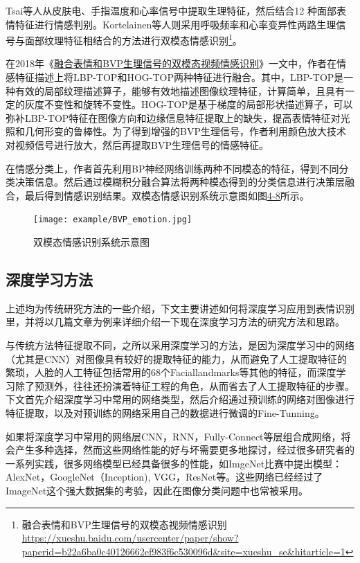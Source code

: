 Tsai等人从皮肤电、手指温度和心率信号中提取生理特征，然后结合12 种面部表情特征进行情感判别。Kortelainen等人则采用呼吸频率和心率变异性两路生理信号与面部纹理特征相结合的方法进行双模态情感识别\footnote{融合表情和BVP生理信号的双模态视频情感识别 \quad \url{https://xueshu.baidu.com/usercenter/paper/show?paperid=b22a6ba0c40126662ef983f6c530096d&site=xueshu_se&hitarticle=1}}。

在2018年《\href{https://xueshu.baidu.com/usercenter/paper/show?paperid=b22a6ba0c40126662ef983f6c530096d&site=xueshu_se&hitarticle=1}{融合表情和BVP生理信号的双模态视频情感识别}》一文中，作者在情感特征描述上将LBP-TOP和HOG-TOP两种特征进行融合。其中，LBP-TOP是一种有效的局部纹理描述算子，能够有效地描述图像纹理特征，计算简单，且具有一定的灰度不变性和旋转不变性。HOG-TOP是基于梯度的局部形状描述算子，可以弥补LBP-TOP特征在图像方向和边缘信息特征提取上的缺失，提高表情特征对光照和几何形变的鲁棒性。为了得到增强的BVP生理信号，作者利用颜色放大技术对视频信号进行放大，然后再提取BVP生理信号的情感特征。

在情感分类上，作者首先利用BP神经网络训练两种不同模态的特征，得到不同分类决策信息。然后通过模糊积分融合算法将两种模态得到的分类信息进行决策层融合，最后得到情感识别结果。双模态情感识别系统示意图如图\href{fig:4-8}{4-8}所示。

\begin{figure}[!htp]
\centering
\texttt{[image: example/BVP\_emotion.jpg]}
\caption{双模态情感识别系统示意图}
\label{fig1:4-8}
\end{figure}

\subsection{深度学习方法}

上述均为传统研究方法的一些介绍，下文主要讲述如何将深度学习应用到表情识别里，并将以几篇文章为例来详细介绍一下现在深度学习方法的研究方法和思路。

与传统方法特征提取不同，之所以采用深度学习的方法，是因为深度学习中的网络（尤其是CNN）对图像具有较好的提取特征的能力，从而避免了人工提取特征的繁琐，人脸的人工特征包括常用的68个Faciallandmarks等其他的特征，而深度学习除了预测外，往往还扮演着特征工程的角色，从而省去了人工提取特征的步骤。下文首先介绍深度学习中常用的网络类型，然后介绍通过预训练的网络对图像进行特征提取，以及对预训练的网络采用自己的数据进行微调的Fine-Tunning。

如果将深度学习中常用的网络层CNN，RNN，Fully-Connect等层组合成网络，将会产生多种选择，然而这些网络性能的好与坏需要更多地探讨，经过很多研究者的一系列实践，很多网络模型已经具备很多的性能，如ImgeNet比赛中提出模型：AlexNet，GoogleNet（Inception), VGG，ResNet等。这些网络已经经过了ImageNet这个强大数据集的考验，因此在图像分类问题中也常被采用。

